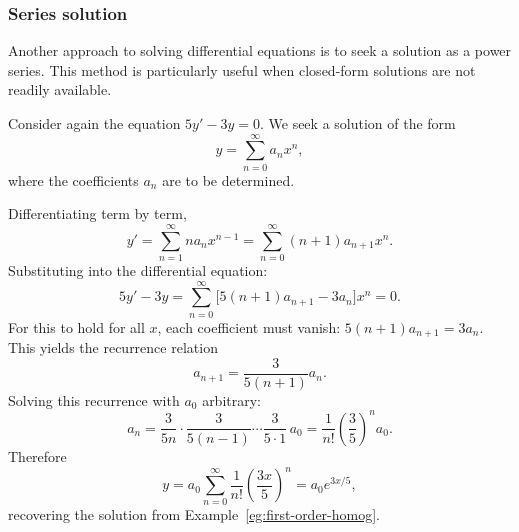 \documentclass[a4paper]{article}
\begin{document}
\begin{center}
\end{center}

\subsubsection*{Series solution}

\begin{remark}
  Another approach to solving differential equations is to seek a solution as a power series. This method is particularly useful when closed-form solutions are not readily available.
\end{remark}

\begin{eg}\label{eg:series-solution}
  Consider again the equation $5y' - 3y = 0$. We seek a solution of the form
  \[
    y = \sum_{n=0}^\infty a_n x^n,
  \]
  where the coefficients $a_n$ are to be determined.

  Differentiating term by term,
  \[
    y' = \sum_{n=1}^\infty n a_n x^{n-1} = \sum_{n=0}^\infty (n+1)a_{n+1}x^n.
  \]
  Substituting into the differential equation:
  \[
    5y' - 3y = \sum_{n=0}^\infty \bigl[5(n+1)a_{n+1} - 3a_n\bigr]x^n = 0.
  \]
  For this to hold for all $x$, each coefficient must vanish: $5(n+1)a_{n+1} = 3a_n$. This yields the recurrence relation
  \[
    a_{n+1} = \frac{3}{5(n+1)}a_n.
  \]
  Solving this recurrence with $a_0$ arbitrary:
  \[
    a_n = \frac{3}{5n} \cdot \frac{3}{5(n-1)} \cdots \frac{3}{5 \cdot 1}\, a_0 = \frac{1}{n!}\left(\frac{3}{5}\right)^n a_0.
  \]
  Therefore
  \[
    y = a_0\sum_{n = 0}^\infty \frac{1}{n!}\left(\frac{3x}{5}\right)^n = a_0 e^{3x/5},
  \]
  recovering the solution from Example~\ref{eg:first-order-homog}.
\end{eg}
\end{document}

